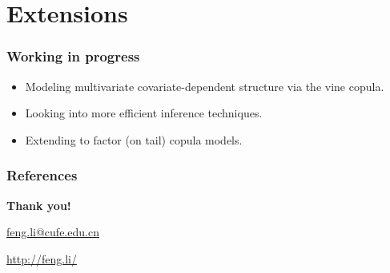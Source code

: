 \documentclass[10pt,aspectratio=43]{beamer}
\begin{document}





\section{Extensions}


\begin{frame}
  \frametitle{Working in progress }

  \begin{itemize}
  \item Modeling multivariate covariate-dependent structure via the vine copula.
  \item Looking into more efficient inference techniques.
  \item Extending to factor (on tail) copula models.
  \end{itemize}
\end{frame}


\begin{frame}[allowframebreaks]
  \frametitle{References}
  
  
\end{frame}


\begin{frame}[plain]
  \addtocounter{framenumber}{-1}
  \begin{center}
    {\color{SUblue} \textbf{\Huge Thank you!}}
    \vspace{1cm}

    \url{feng.li@cufe.edu.cn}

    \vspace{1cm}

    \url{http://feng.li/}

  \end{center}
\end{frame}
\end{document}
